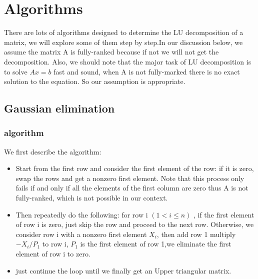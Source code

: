 \documentclass[11pt]{article}
\begin{document}
\section{Algorithms}
There are lots of algorithms designed to determine the LU decomposition of a matrix, we will explore some of them step by step.In our discussion below, we assume the matrix A is fully-ranked because if not we will not get the decomposition. Also, we should note that the major task of LU decomposition is to solve $Ax=b$ fast and sound, when A is not fully-marked there is no exact solution to the equation. So our assumption is appropriate.

\subsection{Gaussian elimination}
\subsubsection{algorithm}
We first describe the algorithm:
\begin{itemize}
    \item Start from the first row and consider the first element of the row: if it is zero, swap the rows and get a nonzero first element. Note that this process only fails if and only if all the elements of the first column are zero thus A is not fully-ranked, which is not possible in our context.
    \item Then repeatedly do the following: for row i $(1 < i \le n)$ , if the first element of row i is zero, just skip the row and proceed to the next row. Otherwise, we consider row i with a nonzero first element $X_{i}$, then add row 1 multiply $-X_{i}/P_{1} $ to row i, $P_{1}$ is the first element of row 1,we eliminate the first element of row i to zero.
    \item just continue the loop until we finally get an Upper triangular matrix.
\end{itemize}
\end{document}
